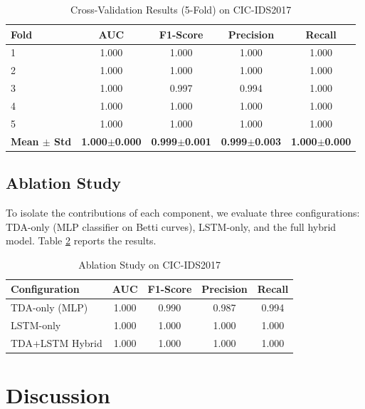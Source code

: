 \documentclass[conference]{IEEEtran}
\begin{document}
\begin{table}[htbp]
\caption{Cross-Validation Results (5-Fold) on CIC-IDS2017}
\begin{center}
\begin{tabular}{|l|c|c|c|c|}
\hline
\textbf{Fold} & \textbf{AUC} & \textbf{F1-Score} & \textbf{Precision} & \textbf{Recall} \\
\hline
1 & 1.000 & 1.000 & 1.000 & 1.000 \\
\hline
2 & 1.000 & 1.000 & 1.000 & 1.000 \\
\hline
3 & 1.000 & 0.997 & 0.994 & 1.000 \\
\hline
4 & 1.000 & 1.000 & 1.000 & 1.000 \\
\hline
5 & 1.000 & 1.000 & 1.000 & 1.000 \\
\hline
\textbf{Mean $\pm$ Std} & \textbf{1.000$\pm$0.000} & \textbf{0.999$\pm$0.001} & \textbf{0.999$\pm$0.003} & \textbf{1.000$\pm$0.000} \\
\hline
\end{tabular}
\label{tab:cross_validation}
\end{center}
\end{table}

\subsection{Ablation Study}

To isolate the contributions of each component, we evaluate three configurations: TDA-only (MLP classifier on Betti curves), LSTM-only, and the full hybrid model. Table \ref{tab:ablation} reports the results.

\begin{table}[htbp]
\caption{Ablation Study on CIC-IDS2017}
\begin{center}
\begin{tabular}{|l|c|c|c|c|}
\hline
\textbf{Configuration} & \textbf{AUC} & \textbf{F1-Score} & \textbf{Precision} & \textbf{Recall} \\
\hline
TDA-only (MLP) & 1.000 & 0.990 & 0.987 & 0.994 \\
\hline
LSTM-only & 1.000 & 1.000 & 1.000 & 1.000 \\
\hline
TDA+LSTM Hybrid & 1.000 & 1.000 & 1.000 & 1.000 \\
\hline
\end{tabular}
\label{tab:ablation}
\end{center}
\end{table}

\section{Discussion}
\end{document}
